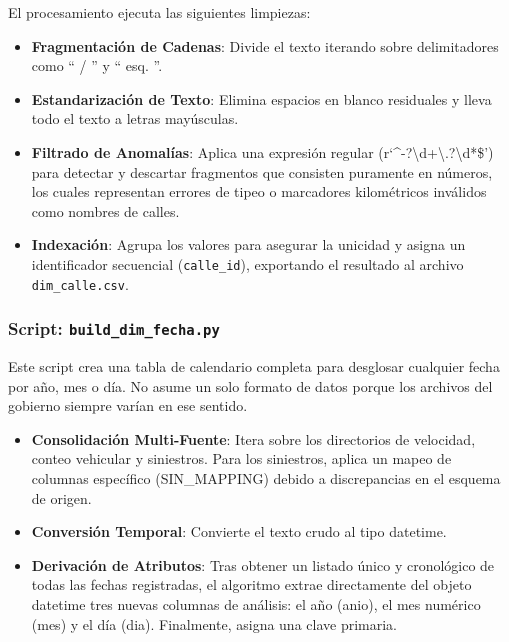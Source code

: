 El procesamiento ejecuta las siguientes limpiezas:
\begin{itemize}[noitemsep]
    \item \textbf{Fragmentación de Cadenas}: 
        Divide el texto iterando sobre delimitadores como `` / '' y `` esq. ''.
    \item \textbf{Estandarización de Texto}:
        Elimina espacios en blanco residuales y lleva todo el texto a letras 
        mayúsculas.
    \item \textbf{Filtrado de Anomalías}:
        Aplica una expresión regular 
        (\textrm{r`\string^-?\textbackslash d+\textbackslash.?\textbackslash d*\$'}) 
        para detectar y descartar fragmentos que consisten puramente en números,
        los cuales representan errores de tipeo o marcadores kilométricos 
        inválidos como nombres de calles.
    \item \textbf{Indexación}: 
        Agrupa los valores para asegurar la unicidad y asigna un identificador
        secuencial (\texttt{calle\_id}), exportando el resultado al archivo
        \texttt{dim\_calle.csv}.
\end{itemize}

\subsubsection*{Script: \texttt{build\_dim\_fecha.py}}

Este script crea una tabla de calendario completa para desglosar cualquier fecha
por año, mes o día. 
No asume un solo formato de datos porque los archivos del gobierno siempre
varían en ese sentido.
\begin{itemize}[noitemsep]
    \item \textbf{Consolidación Multi-Fuente}:
        Itera sobre los directorios de velocidad, conteo vehicular y siniestros.
        Para los siniestros, aplica un mapeo de columnas específico 
        (SIN\_MAPPING) debido a discrepancias en el esquema de origen.
    \item \textbf{Conversión Temporal}:
        Convierte el texto crudo al tipo datetime.
    \item \textbf{Derivación de Atributos}:
        Tras obtener un listado único y cronológico de todas las fechas 
        registradas, el algoritmo extrae directamente del objeto datetime tres 
        nuevas columnas de análisis: el año (anio), el mes numérico (mes) y el 
        día (dia). Finalmente, asigna una clave primaria.
\end{itemize}

